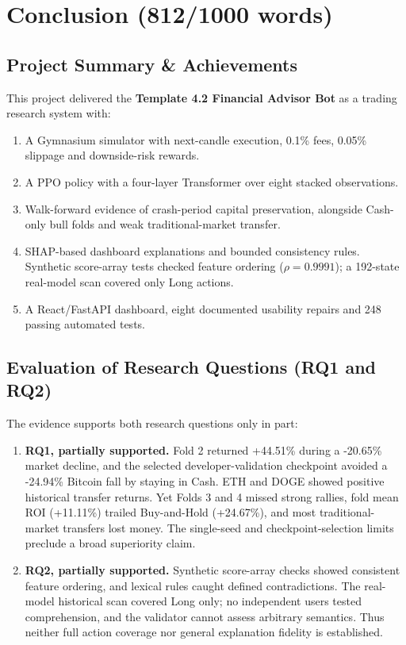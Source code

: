\documentclass[11pt,a4paper]{article}
\begin{document}
\newpage
\section{Conclusion (812/1000 words)}

\subsection{Project Summary \& Achievements}
This project delivered the \textbf{Template 4.2 Financial Advisor Bot} as a trading research system with:
\begin{enumerate}[leftmargin=2em, itemsep=1pt, parsep=0pt]
    \item A Gymnasium simulator with next-candle execution, 0.1\% fees, 0.05\% slippage and downside-risk rewards.
    \item A PPO policy with a four-layer Transformer over eight stacked observations.
    \item Walk-forward evidence of crash-period capital preservation, alongside Cash-only bull folds and weak traditional-market transfer.
    \item SHAP-based dashboard explanations and bounded consistency rules. Synthetic score-array tests checked feature ordering ($\rho=0.9991$); a 192-state real-model scan covered only Long actions.
    \item A React/FastAPI dashboard, eight documented usability repairs and 248 passing automated tests.
\end{enumerate}

\subsection{Evaluation of Research Questions (RQ1 and RQ2)}
\label{sec:rq_evaluation}
The evidence supports both research questions only in part:

\begin{enumerate}[leftmargin=2em]
    \item \textbf{RQ1, partially supported.} Fold 2 returned +44.51\% during a -20.65\% market decline, and the selected developer-validation checkpoint avoided a -24.94\% Bitcoin fall by staying in Cash. ETH and DOGE showed positive historical transfer returns. Yet Folds 3 and 4 missed strong rallies, fold mean ROI (+11.11\%) trailed Buy-and-Hold (+24.67\%), and most traditional-market transfers lost money. The single-seed and checkpoint-selection limits preclude a broad superiority claim.

    \item \textbf{RQ2, partially supported.} Synthetic score-array checks showed consistent feature ordering, and lexical rules caught defined contradictions. The real-model historical scan covered Long only; no independent users tested comprehension, and the validator cannot assess arbitrary semantics. Thus neither full action coverage nor general explanation fidelity is established.
\end{enumerate}
\end{document}
